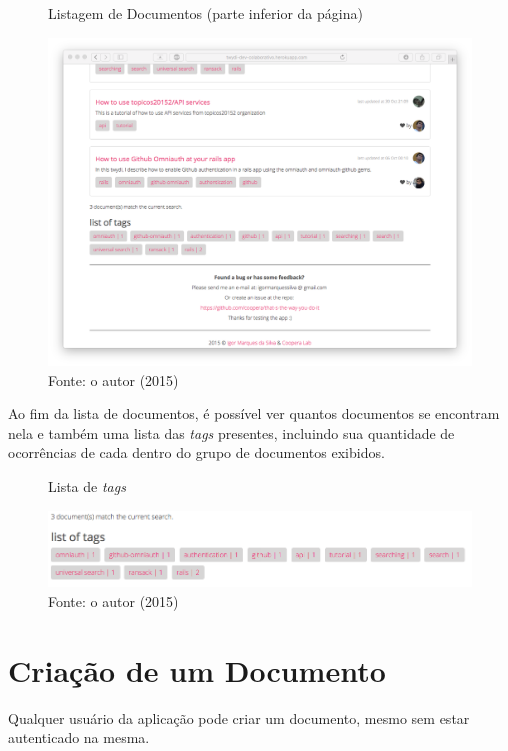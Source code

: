 \begin{figure}[h]
	\centering
    \caption{Listagem de Documentos (parte inferior da página)}
    \includegraphics[width=15cm]{Imagens/print-lista-2.png}
	\caption*{Fonte: o autor (2015)}
\end{figure}

Ao fim da lista de documentos, é possível ver quantos documentos se encontram nela e também uma lista das \textit{tags} presentes, incluindo sua quantidade de ocorrências de cada dentro do grupo de documentos exibidos.

\begin{figure}[h]
	\centering
    \caption{Lista de \textit{tags}}
    \includegraphics[width=20cm]{Imagens/print-tags.png}
	\caption*{Fonte: o autor (2015)}
\end{figure}


\section{Criação de um Documento}

Qualquer usuário da aplicação pode criar um documento, mesmo sem estar autenticado na mesma.

